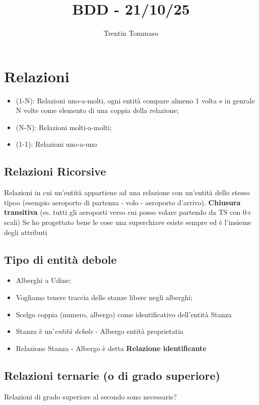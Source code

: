 \documentclass{article}
\title{BDD - 21/10/25}
\author{Trentin Tommaso}
\begin{document}
  \section{Relazioni}
    \begin{itemize}
      \item (1-N): Relazioni uno-a-molti, ogni entità compare almeno 1 volta e in genrale N volte come elemento di una coppia della relazione;
      \item (N-N): Relazioni molti-a-molti; 
      \item (1-1): Relazioni uno-a-uno
    \end{itemize}
    \subsection{Relazioni Ricorsive}
      Relazioni in cui un'entità appartiene ad una relazione con un'entità dello stesso tipoo (esempio aeroporto di partenza - volo - aeroporto d'arrivo). \textbf{Chiusura transitiva} (es. tutti gli aeroporti verso cui posso volare partendo da TS con 0+ scali)
    Se ho progettato bene le cose una superchiave esiste sempre ed è l'insieme degli attributi
    \subsection{Tipo di entità debole}
      \begin{itemize}
        \item Alberghi a Udine;
        \item Vogliamo tenere traccia delle stanze libere negli alberghi;
        \item Scelgo coppia (numero, albergo) come identificativo dell'entità Stanza
        \item Stanza è un'\textit{entità debole} - Albergo entità proprietatia
        \item Relazione Stanza - Albergo è detta \textbf{Relazione identificante}
      \end{itemize}
    \subsection{Relazioni ternarie (o di grado superiore)}
      Relazioni di grado superiore al secondo sono necessarie? 
\end{document}
